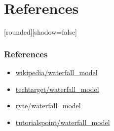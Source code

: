 \documentclass[10pt]{beamer}
\begin{document}
\section{References}
\begin{frame}
    [rounded][shadow=false]
    \frametitle{References}
    \begin{itemize}

        \item \href{https://en.wikipedia.org/wiki/Waterfall_model}{wikipedia/waterfall\_model}
            
        \item \href{https://www.techtarget.com/searchsoftwarequality/definition/waterfall-model}{techtarget/waterfall\_model}
            
        \item \href{https://en.ryte.com/wiki/Waterfall_Model}{ryte/waterfall\_model}
        
        \item \href{https://www.tutorialspoint.com/sdlc/sdlc_waterfall_model.htm}{tutorialspoint/waterfall\_model}
            
    \end{itemize}

\end{frame}
\end{document}
